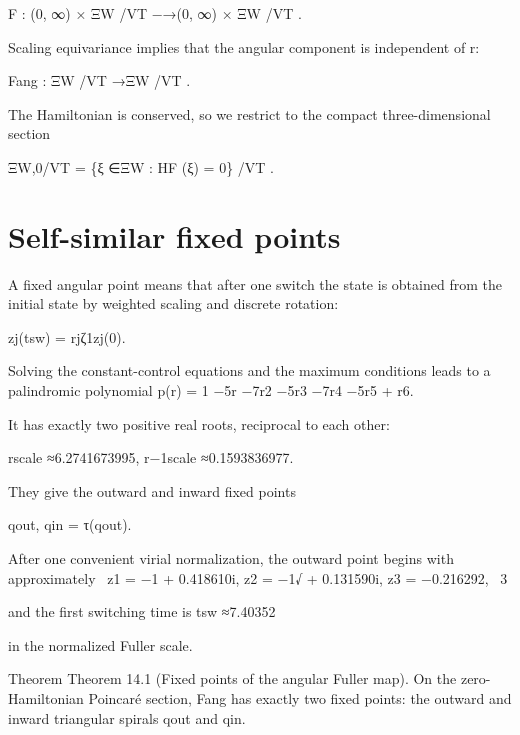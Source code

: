 \begin{displaytext}
F : (0, ∞) × ΞW /VT −→(0, ∞) × ΞW /VT .
\end{displaytext}

Scaling equivariance implies that the angular component is independent of r:


Fang : ΞW /VT →ΞW /VT .


The Hamiltonian is conserved, so we restrict to the compact three-dimensional section


\begin{displaytext}
ΞW,0/VT = \{ξ ∈ΞW : HF (ξ) = 0\} /VT .
\end{displaytext}

\section{Self-similar fixed points}

A fixed angular point means that after one switch the state is obtained from the initial state by weighted scaling and discrete rotation:


\begin{displaytext}
zj(tsw) = rjζ1zj(0).
\end{displaytext}

Solving the constant-control equations and the maximum conditions leads to a palindromic polynomial p(r) = 1 −5r −7r2 −5r3 −7r4 −5r5 + r6.


It has exactly two positive real roots, reciprocal to each other:


\begin{displaytext}
rscale ≈6.2741673995, r−1scale ≈0.1593836977.
\end{displaytext}

They give the outward and inward fixed points


\begin{displaytext}
qout, qin = τ(qout).
\end{displaytext}

\begin{displaytext}
After one convenient virial normalization, the outward point begins with approximately \
z1 = −1 + 0.418610i, z2 = −1√ + 0.131590i, z3 = −0.216292, \
3
\end{displaytext}

and the first switching time is tsw ≈7.40352


in the normalized Fuller scale.


\begin{statementbox}{Theorem}
Theorem 14.1 (Fixed points of the angular Fuller map). On the zero-Hamiltonian Poincaré section, Fang has exactly two fixed points: the outward and inward triangular spirals qout and qin.
\end{statementbox}


